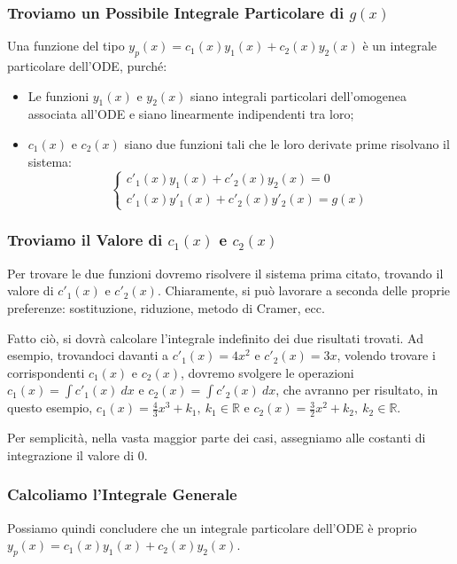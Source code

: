 \documentclass[a4paper,11pt]{article}
\begin{document}
\subsubsection[Integrale Particolare]{Troviamo un Possibile Integrale Particolare di $g(x)$}
Una funzione del tipo $y_p(x)=c_1(x)y_1(x)+c_2(x)y_2(x)$ è un integrale particolare dell'ODE, purché:
\begin{itemize}
	\item Le funzioni $y_1(x)$ e $y_2(x)$ siano integrali particolari dell'omogenea associata all'ODE e siano linearmente indipendenti tra loro;
	\item $c_1(x)$ e $c_2(x)$ siano due funzioni tali che le loro derivate prime risolvano il sistema:
	\begin{equation*}
        \begin{cases}
            c'_1(x)y_1(x)+c'_2(x)y_2(x)=0 \\
            c'_1(x)y'_1(x)+c'_2(x)y'_2(x)=g(x)
        \end{cases}
    \end{equation*}
\end{itemize}
\subsubsection[\texorpdfstring{Calcolo di $c1(x)$ e $c_2(x)$}{Calcolo di c1(x) e c2(x)}]{Troviamo il Valore di $c_1(x)$ e $c_2(x)$}
Per trovare le due funzioni dovremo risolvere il sistema prima citato, trovando il valore di $c'_1(x)$ e $c'_2(x)$. Chiaramente, si può lavorare a seconda delle proprie preferenze: sostituzione, riduzione, metodo di Cramer, ecc.

\noindent Fatto ciò, si dovrà calcolare l'integrale indefinito dei due risultati trovati. Ad esempio, trovandoci davanti a $c'_1(x)=4x^2$ e $c'_2(x)=3x$, volendo trovare i corrispondenti $c_1(x)$ e $c_2(x)$, dovremo svolgere le operazioni $c_1(x)=\int{c'_1(x)~dx}$ e $c_2(x)=\int{c'_2(x)~dx}$, che avranno per risultato, in questo esempio, $c_1(x)=\frac{4}{3}x^3+k_1,~k_1\in\mathbb{R}$ e $c_2(x)=\frac{3}{2}x^2+k_2,~k_2\in\mathbb{R}$.

\noindent Per semplicità, nella vasta maggior parte dei casi, assegniamo alle costanti di integrazione il valore di 0.

\subsubsection[Integrale Generale]{Calcoliamo l'Integrale Generale}
Possiamo quindi concludere che un integrale particolare dell'ODE è proprio $y_p(x)=c_1(x)y_1(x)+c_2(x)y_2(x)$.
\end{document}
